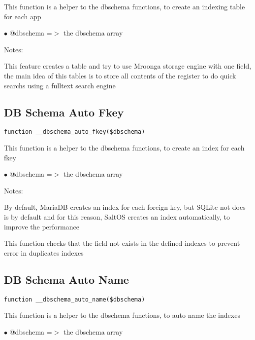 \documentclass[a4paper]{book}
\begin{document}
This function is a helper to the dbschema functions, to create an indexing table for each app

\begin{compactitem}
\item[\color{myblue}$\bullet$] @dbschema =$>$ the dbschema array
\end{compactitem}

Notes:

This feature creates a table and try to use Mroonga storage engine with one field, the main
idea of this tables is to store all contents of the register to do quick searchs using a
fulltext search engine

\hypertarget{toc98}{}
\subsection{DB Schema Auto Fkey}

\begin{lstlisting}
function __dbschema_auto_fkey($dbschema)
\end{lstlisting}

This function is a helper to the dbschema functions, to create an index for each fkey

\begin{compactitem}
\item[\color{myblue}$\bullet$] @dbschema =$>$ the dbschema array
\end{compactitem}

Notes:

By default, MariaDB creates an index for each foreign key, but SQLite not does is by default
and for this reason, SaltOS creates an index automatically, to improve the performance

This function checks that the field not exists in the defined indexes to prevent error in duplicates
indexes

\hypertarget{toc99}{}
\subsection{DB Schema Auto Name}

\begin{lstlisting}
function __dbschema_auto_name($dbschema)
\end{lstlisting}

This function is a helper to the dbschema functions, to auto name the indexes

\begin{compactitem}
\item[\color{myblue}$\bullet$] @dbschema =$>$ the dbschema array
\end{compactitem}
\end{document}
